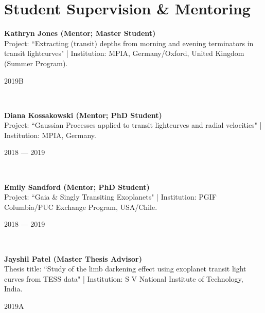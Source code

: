\documentclass[12pt, a4paper]{article} %
\begin{document}
\section*{Student Supervision \& Mentoring}
\begin{minipage}[t]{0.7\textwidth}
\begin{flushleft}%
  \setlength{\leftskip}{0.2cm}%
\textbf{Kathryn Jones (Mentor; Master Student)}\\
Project: ``Extracting (transit) depths from morning and evening terminators in transit lightcurves" | Institution: MPIA, Germany/Oxford, United Kingdom (Summer Program).
\end{flushleft}
\end{minipage}
\begin{minipage}[t]{0.3\textwidth}
\hfill 2019B
\end{minipage}\\

\begin{minipage}[t]{0.7\textwidth}
\begin{flushleft}%
  \setlength{\leftskip}{0.2cm}%
\textbf{Diana Kossakowski (Mentor; PhD Student)}\\
Project: ``Gaussian Processes applied to transit lightcurves and radial velocities" | Institution: MPIA, Germany.
\end{flushleft}
\end{minipage}
\begin{minipage}[t]{0.3\textwidth}
\hfill 2018 --- 2019
\end{minipage}\\

\begin{minipage}[t]{0.7\textwidth}
\begin{flushleft}%
  \setlength{\leftskip}{0.2cm}%
\textbf{Emily Sandford (Mentor; PhD Student)}\\
Project: ``Gaia \& Singly Transiting Exoplanets" | Institution: PGIF Columbia/PUC Exchange Program, USA/Chile.
\end{flushleft}
\end{minipage}
\begin{minipage}[t]{0.3\textwidth}
\hfill 2018 --- 2019
\end{minipage}\\

\begin{minipage}[t]{0.7\textwidth}
\begin{flushleft}%
  \setlength{\leftskip}{0.2cm}%
\textbf{Jayshil Patel (Master Thesis Advisor)}\\
Thesis title: ``Study of the limb darkening effect using exoplanet transit light curves from TESS data" | Institution: S V National Institute of Technology, India.
\end{flushleft}
\end{minipage}
\begin{minipage}[t]{0.3\textwidth}
\hfill 2019A
\end{minipage}\\
\end{document}
